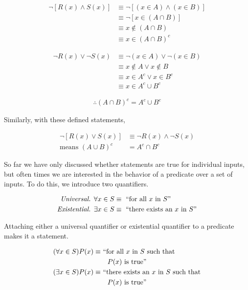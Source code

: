 \documentclass{report}
\begin{document}
\begin{align*}
	\neg[R(x) \wedge S(x)] &\equiv \neg[(x \in A) \wedge (x \in B)] \\
	&\equiv \neg[x \in (A \cap B)] \\
	&\equiv x \notin (A \cap B) \\
	&\equiv x \in (A \cap B)^c
\end{align*}

\begin{align*}
	\neg R(x) \lor \neg S(x) &\equiv \neg(x \in A) \lor \neg(x \in B) \\
	&\equiv x \notin A \lor x \notin B \\
	&\equiv x \in A^c \lor x \in B^c \\
	&\equiv x \in A^c \cup B^c
\end{align*}

\begin{align*}
	\therefore (A \cap B)^c = A^c \cup B^c
\end{align*}

Similarly, with these defined statements,

\begin{align*}
	\neg[R(x) \lor S(x)] &\equiv \neg R(x) \wedge \neg S(x) \\
	\text{means } (A \cup B)^c &= A^c \cap B^c
\end{align*}

So far we have only discussed whether statements are true for individual inputs, but often times we are interested in the behavior of a predicate over a set of inputs. To do this, we introduce two quantifiers.

\begin{align*}
	\emph{Universal. } \forall x \in S &\equiv \text{ ``for all $x$ in $S$''} \\
	\emph{Existential. } \exists x \in S &\equiv \text{ ``there exists an $x$ in $S$''}
\end{align*}

Attaching either a universal quantifier or existential quantifier to a predicate makes it a statement.

\begin{align*}
	(\forall x \in S)P(x) \equiv &\text{ ``for all $x$ in $S$ such that} \\
	& \text{\quad $P(x)$ is true''} \\
	(\exists x \in S)P(x) \equiv &\text{ ``there exists an $x$ in $S$ such that} \\
	& \text{\quad $P(x)$ is true''}
\end{align*}
\end{document}
